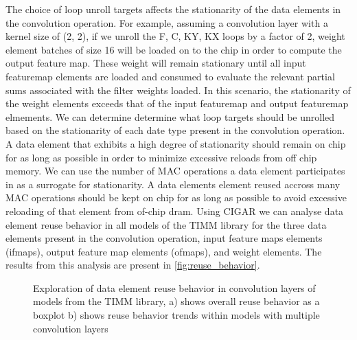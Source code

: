 The choice of loop unroll targets affects the stationarity of the data elements
in the convolution operation. For example, assuming a convolution layer with a
kernel size of (2, 2), if we unroll the F, C, KY, KX loops by a factor of 2,
weight element batches of size 16 will be loaded on to the chip in order to
compute the output feature map. These weight will remain stationary until all
input featuremap elements are loaded and consumed to evaluate the relevant
partial sums associated with the filter weights loaded. In this scenario, the
stationarity of the weight elements exceeds that of the input featuremap and
output featuremap elmements.   
We can determine determine what loop targets should be unrolled based on the
stationarity of each date type present in the convolution operation. A data
element that exhibits a high degree of stationarity should remain on chip for as
long as possible in order to minimize excessive reloads from off chip memory. We
can use the number of MAC operations a data element participates in as a
surrogate for stationarity. A data elements element reused accross many MAC operations
should be kept on chip for as long as possible to avoid excessive reloading of
that element from of-chip dram. Using CIGAR we can analyse data element reuse
behavior in all models of the TIMM library for the three data elements present in the convolution operation, input
feature maps elements (ifmaps), output feature map elements (ofmaps), and weight
elements. The results from this analysis are present in
\autoref{fig:reuse_behavior}. 

\begin{figure}
    \centering
    \caption{Exploration of data element reuse behavior in convolution layers of models from the TIMM library, a) shows overall reuse behavior as a boxplot b) shows reuse behavior trends within models with multiple convolution layers}
    \label{fig:reuse_behavior}
\end{figure}


